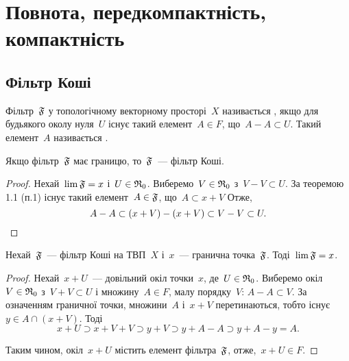 \chapter{Повнота, передкомпактність, компактність}

\section{Фільтр Коші}

\begin{definition}
    Фільтр~$\frak F$ у топологічному векторному просторі~$X$ називається , якщо для будьякого околу нуля~$U$ існує такий елемент~$A \in F$, що~$A - A \subset U$. Такий елемент~$A$ називається .
\end{definition}

\begin{theorem}
    Якщо фільтр~$\frak F$ має границю, то~$\frak F$~--- фільтр Коші.
\end{theorem}

\begin{proof}
    Нехай~$\lim \frak F = x$ і~$U \in \frak R_0$. Виберемо~$V \in \frak R_0$ з~$V - V \subset U$. За теоремою 1.1 (п.1) існує такий елемент~$A \in \frak F$, що~$A \subset x + V$ Отже,
    \begin{equation*}
        A - A \subset(x + V) -(x + V) \subset V - V \subset U. \qedhere
    \end{equation*}
\end{proof}

\begin{theorem}
    Нехай~$\frak F$~--- фільтр Коші на ТВП~$X$ і~$x$~--- гранична точка~$\frak F$. Тоді~$\lim \frak F = x$.
\end{theorem}

\begin{proof}
    Нехай~$x + U$~--- довільний окіл точки~$x$, де~$U \in \frak R_0$. Виберемо окіл~$V \in \frak R_0$ з~$V + V \subset U$ і множину~$A \in F$, малу порядку~$V$: $A - A \subset V$. За означенням граничної точки, множини~$A$ і~$x + V$ перетинаються, тобто існує~$y \in A \cap(x + V)$. Тоді
    \begin{equation*}
        x + U \supset x + V + V \supset y + V \supset y + A - A \supset y + A - y = A.
    \end{equation*}

    Таким чином, окіл~$x + U$ містить елемент фільтра~$\frak F$, отже,~$x + U \in F$.
\end{proof}

